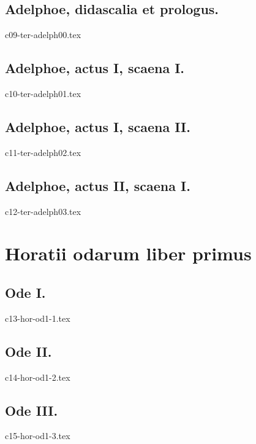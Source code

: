 \documentclass[a4paper,12pt,twoside]{report}
\begin{document}
\chapter{Adelphoe, didascalia et prologus.}


{c09-ter-adelph00.tex}

\chapter{Adelphoe, actus I, scaena I.}


{c10-ter-adelph01.tex}

\chapter{Adelphoe, actus I, scaena II.}


{c11-ter-adelph02.tex}

\chapter{Adelphoe, actus II, scaena I.}


{c12-ter-adelph03.tex}


\part{Horatii odarum liber primus}

\chapter{Ode I.}


{c13-hor-od1-1.tex}

\chapter{Ode II.}


{c14-hor-od1-2.tex}

\chapter{Ode III.}


{c15-hor-od1-3.tex}



\tableofcontents
\end{document}
